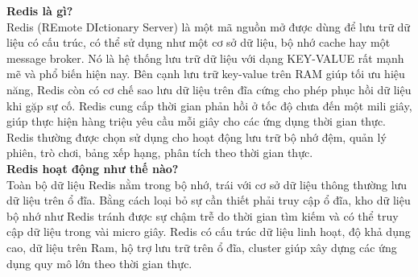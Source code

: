 \textbf{Redis là gì?}\\

Redis (REmote DIctionary Server) là một mã nguồn mở được dùng để lưu trữ dữ liệu có cấu trúc, có thể sử dụng như một cơ sở dữ liệu, bộ nhớ cache hay một message broker. Nó là hệ thống lưu trữ dữ liệu với dạng KEY-VALUE rất mạnh mẽ và phổ biến hiện nay.
Bên cạnh lưu trữ key-value trên RAM giúp tối ưu hiệu năng, Redis còn có cơ chế sao lưu dữ liệu trên đĩa cứng cho phép phục hồi dữ liệu khi gặp sự cố.
Redis cung cấp thời gian phản hồi ở tốc độ chưa đến một mili giây, giúp thực hiện hàng triệu yêu cầu mỗi giây cho các ứng dụng thời gian thực.
Redis thường được chọn sử dụng cho hoạt động lưu trữ bộ nhớ đệm, quản lý phiên, trò chơi, bảng xếp hạng, phân tích theo thời gian thực.\\

\textbf{Redis hoạt động như thế nào?}\\

Toàn bộ dữ liệu Redis nằm trong bộ nhớ, trái với cơ sở dữ liệu thông thường lưu dữ liệu trên ổ đĩa. Bằng cách loại bỏ sự cần thiết phải truy cập ổ đĩa, kho dữ liệu bộ nhớ như Redis tránh được sự chậm trễ do thời gian tìm kiếm và có thể truy cập dữ liệu trong vài micro giây. Redis có cấu trúc dữ liệu linh hoạt, độ khả dụng cao, dữ liệu trên Ram, hộ trợ lưu trữ trên ổ đĩa, cluster giúp xây dựng các ứng dụng quy mô lớn theo thời gian thực.\\

